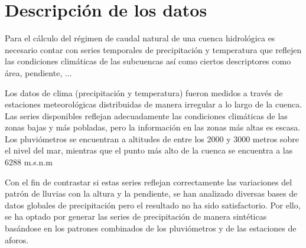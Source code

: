 \chapter{Descripción de los datos}
\label{capitulo 1}



Para el cálculo del régimen de caudal natural de una cuenca hidrológica es necesario contar con series temporales de 
precipitación y temperatura que reflejen las condiciones climáticas de las subcuencas así como ciertos descriptores
como área, pendiente, ...


Los datos de clima (precipitación y temperatura) fueron medidos a través de estaciones meteorológicas distribuidas de manera 
irregular a lo largo de la cuenca. Las series disponibles reflejan adecuadamente las condiciones climáticas de las zonas bajas y más pobladas,
pero la información en las zonas más altas es escasa. Los pluviómetros se encuentran a altitudes de entre
los 2000 y 3000 metros sobre el nivel del mar, mientras que el punto más alto de la cuenca se encuentra a las 6288 m.s.n.m

Con el fin de contrastar si estas series reflejan 
correctamente las variaciones del patrón de lluvias con la altura y la pendiente, 
se han analizado diversas bases de datos globales de precipitación pero el resultado no ha sido 
satisfactorio.  Por ello, se ha optado por generar las series de precipitación de manera sintéticas basándose 
en los patrones combinados de los pluviómetros y de las estaciones de aforos.



